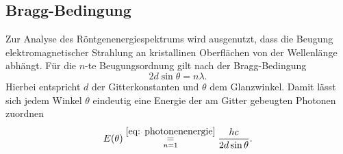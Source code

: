 \subsection{Bragg-Bedingung}
Zur Analyse des Röntgenenergiespektrums wird ausgenutzt, dass die Beugung elektromagnetischer Strahlung an kristallinen
Oberflächen von der Wellenlänge abhängt. Für die $n$-te Beugungsordnung gilt nach der Bragg-Bedingung
\begin{equation}
  2 d \sin\theta = n \lambda.
  \label{eq: bragg}
\end{equation}
Hierbei entspricht $d$ der Gitterkonstanten und $\theta$ dem Glanzwinkel. Damit lässt sich jedem Winkel $\theta$ eindeutig eine
Energie der am Gitter gebeugten Photonen zuordnen
\begin{equation}
  E(\theta) \overset{\eqref{eq: photonenenergie} }{\underset{n = 1}{=}} \frac{h c}{2 d \sin \theta}.
  \label{eq: E_beugungswinkel}
\end{equation}
